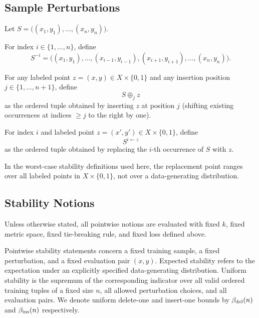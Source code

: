 \subsection{Sample Perturbations}

Let $S = \big((x_1, y_1), \ldots, (x_n, y_n)\big)$.

\begin{definition}
For index $i \in \{1, \ldots, n\}$, define
\[
S^{-i} = \big((x_1, y_1), \ldots, (x_{i-1}, y_{i-1}), (x_{i+1}, y_{i+1}), \ldots, (x_n, y_n)\big).
\]
\end{definition}

\begin{definition}
For any labeled point $z = (x, y) \in X \times \{0,1\}$ and any insertion position $j \in \{1, \ldots, n+1\}$, define
\[
S \oplus_j z
\]
as the ordered tuple obtained by inserting $z$ at position $j$ (shifting existing occurrences at indices $\ge j$ to the right by one).
\end{definition}

\begin{definition}
For index $i$ and labeled point $z = (x', y') \in X \times \{0,1\}$, define
\[
S^{i \leftarrow z}
\]
as the ordered tuple obtained by replacing the $i$-th occurrence of $S$ with $z$.
\end{definition}

In the worst-case stability definitions used here, the replacement point ranges over all labeled points in $X \times \{0,1\}$, not over a data-generating distribution.

\subsection{Stability Notions}

Unless otherwise stated, all pointwise notions are evaluated with fixed $k$, fixed metric space, fixed tie-breaking rule, and fixed loss defined above.

\begin{note}
Pointwise stability statements concern a fixed training sample, a fixed perturbation, and a fixed evaluation pair $(x, y)$. Expected stability refers to the expectation under an explicitly specified data-generating distribution. Uniform stability is the supremum of the corresponding indicator over all valid ordered training tuples of a fixed size $n$, all allowed perturbation choices, and all evaluation pairs. We denote uniform delete-one and insert-one bounds by $\beta_{\mathrm{del}}(n)$ and $\beta_{\mathrm{ins}}(n)$ respectively.
\end{note}

